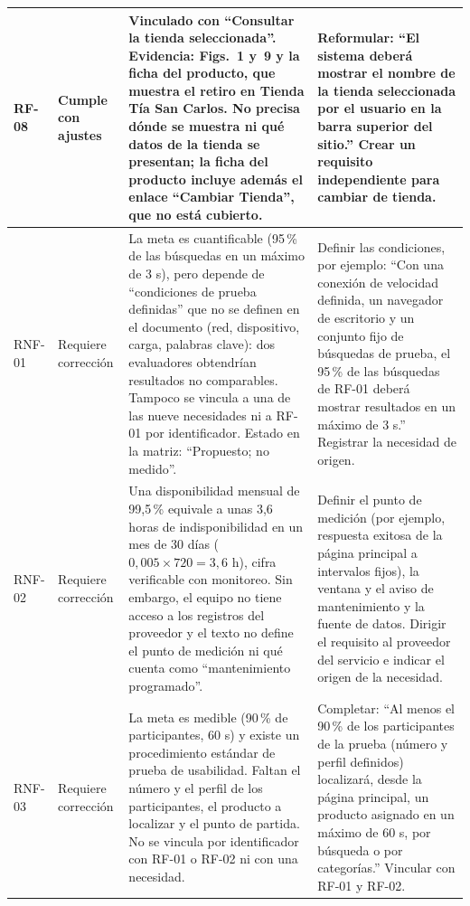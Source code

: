 \documentclass[12pt,a4paper]{article}
\begin{document}
\begin{longtable}{|L{0.075\textwidth}|L{0.11\textwidth}|L{0.40\textwidth}|L{0.31\textwidth}|}
RF-08 & Cumple con ajustes &
Vinculado con ``Consultar la tienda seleccionada''. Evidencia:
Figs.~1 y~9 y la ficha del producto, que
muestra el retiro en Tienda Tía San Carlos. No precisa dónde se
muestra ni qué datos de la tienda se presentan; la ficha del
producto incluye además el enlace ``Cambiar Tienda'', que no está
cubierto. &
Reformular: ``El sistema deberá mostrar el nombre de la tienda
seleccionada por el usuario en la barra superior del sitio.''
Crear un requisito independiente para cambiar de tienda. \\
\hline

RNF-01 & Requiere corrección &
La meta es cuantificable (95\,\% de las búsquedas en un máximo
de 3 s), pero depende de ``condiciones de prueba definidas'' que
no se definen en el documento (red, dispositivo, carga, palabras
clave): dos evaluadores obtendrían resultados no comparables.
Tampoco se vincula a una de las nueve necesidades ni a RF-01
por identificador. Estado en la matriz: ``Propuesto; no medido''. &
Definir las condiciones, por ejemplo: ``Con una conexión de
velocidad definida, un navegador de escritorio y un conjunto
fijo de búsquedas de prueba, el 95\,\% de las búsquedas de RF-01
deberá mostrar resultados en un máximo de 3 s.'' Registrar la
necesidad de origen. \\
\hline

RNF-02 & Requiere corrección &
Una disponibilidad mensual de 99,5\,\% equivale a unas
3,6 horas de indisponibilidad en un mes de 30 días
(\(0{,}005 \times 720 = 3{,}6\) h), cifra verificable con monitoreo. Sin
embargo, el equipo no tiene acceso a los registros del proveedor y
el texto no define el punto de medición ni qué cuenta como
``mantenimiento programado''. &
Definir el punto de medición (por ejemplo, respuesta exitosa de la
página principal a intervalos fijos), la ventana y el aviso de
mantenimiento y la fuente de datos. Dirigir el requisito al
proveedor del servicio e indicar el origen de la necesidad. \\
\hline

RNF-03 & Requiere corrección &
La meta es medible (90\,\% de participantes, 60 s) y existe un
procedimiento estándar de prueba de usabilidad. Faltan el número
y el perfil de los participantes, el producto a localizar y el
punto de partida. No se vincula por identificador con RF-01 o
RF-02 ni con una necesidad. &
Completar: ``Al menos el 90\,\% de los participantes de la prueba
(número y perfil definidos) localizará, desde la página principal,
un producto asignado en un máximo de 60 s, por búsqueda o por
categorías.'' Vincular con RF-01 y RF-02. \\
\hline


\end{longtable}
\end{document}
